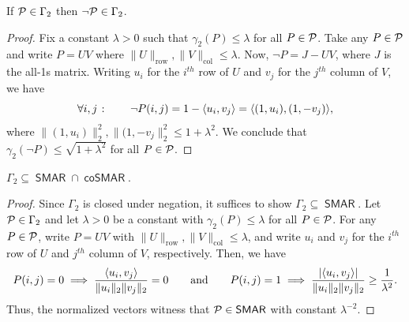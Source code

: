 \documentclass{article}
\newcommand{\cplxclass}[1]{\mathsf{#1}}
\DeclareMathOperator{\SMAR}{\cplxclass{SMAR}}
\DeclareMathOperator{\coSMAR}{\cplxclass{coSMAR}}
\begin{document}
\begin{fact}
    If $\mathcal{P} \in \Gamma_2$ then $\neg \mathcal{P} \in \Gamma_2$.
\end{fact}
\begin{proof}
    Fix a constant $\lambda > 0$ such that $\gamma_2(P) \leq \lambda$ for all $P
    \in \mathcal{P}$. Take any $P \in \mathcal{P}$ and write $P = UV$ where $\|U\|_\text{row},
    \|V\|_\text{col} \leq \lambda$. Now, $\neg P = J-UV$, where $J$ is the all-1s matrix.
    Writing $u_i$ for the $i^{th}$ row of $U$ and $v_j$ for the $j^{th}$ column of $V$, we have
    \[
        \forall i,j \;\colon\qquad \neg P(i,j) = 1 - \langle u_i, v_j \rangle
        = \langle (1, u_i), (1, - v_j) \rangle ,
    \]
    where $\|(1,u_i)\|_2^2, \|(1, -v_j\|_2^2 \leq 1 + \lambda^2$. We conclude that
    $\gamma_2(\neg P) \leq \sqrt{1+\lambda^2}$ for all $P \in \mathcal{P}$.
\end{proof}

\begin{boxproposition}\label{prop:gamma-in-smar}
    $\Gamma_2 \subseteq \SMAR \cap \coSMAR$.
\end{boxproposition}
\begin{proof}
Since $\Gamma_2$ is closed under negation, it suffices to show $\Gamma_2
\subseteq \SMAR$. Let $\mathcal{P} \in \Gamma_2$ and let $\lambda > 0$ be a constant
with $\gamma_2(P) \leq \lambda$ for all $P \in \mathcal{P}$. For any $P \in \mathcal{P}$,
write $P = UV$ with $\|U\|_\text{row}, \|V\|_\text{col} \leq \lambda$,
and write $u_i$ and $v_j$ for the $i^{th}$ row of $U$ and $j^{th}$ column of $V$,
respectively. Then, we have
\[
    P(i,j) = 0 \implies \frac{\langle u_i, v_j \rangle}{\|u_i\|_2 \|v_j\|_2 } = 0 \qquad\text{and}\qquad
    P(i,j) = 1 \implies \frac{ |\langle u_i, v_j \rangle| }{\|u_i\|_2 \|v_j\|_2 }
            \geq \frac{1}{\lambda^2}.
\]
Thus, the normalized vectors witness that $\cP \in \SMAR$ with constant $\lambda^{-2}$.
\end{proof}
\end{document}
